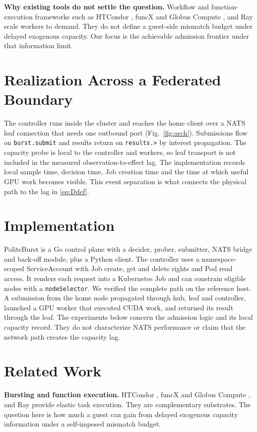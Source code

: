 \documentclass[10pt,conference,letterpaper]{IEEEtran}
\newcommand{\sysname}{PoliteBurst}
\begin{document}
\textbf{Why existing tools do not settle the question.}
Workflow and function-execution frameworks such as HTCondor \cite{htcondor},
funcX and Globus Compute \cite{funcx}, and Ray \cite{ray} scale workers to demand.
They do not define a guest-side mismatch budget under delayed exogenous capacity.
Our focus is the achievable admission frontier under that information limit.



\section{Realization Across a Federated Boundary}
\label{sec:fabric}
The controller runs inside the cluster and reaches the home client over a NATS
\cite{nats} leaf connection that needs one outbound port
(Fig.~\ref{fig:arch}). Submissions flow on \texttt{burst.submit} and results
return on \texttt{results.>} by interest propagation. The capacity probe is local
to the controller and workers, so leaf transport is not included in the measured
observation-to-effect lag. The implementation records local sample time, decision
time, Job creation time and the time at which useful GPU work becomes visible.
This event separation is what connects the physical path to the lag in
\eqref{eq:Ddef}.

\section{Implementation}
\label{sec:impl}
\sysname{} is a Go control plane with a decider, prober, submitter, NATS bridge
and back-off module, plus a Python client. The controller uses a namespace-scoped
ServiceAccount with Job create, get and delete rights and Pod read access. It
renders each request into a Kubernetes Job and can constrain eligible nodes with
a \texttt{nodeSelector}. We verified the complete path on the reference host. A
submission from the home node propagated through hub, leaf and controller,
launched a GPU worker that executed CUDA work, and returned its result through
the leaf. The experiments below concern the admission logic and its local
capacity record. They do not characterize NATS performance or claim that the
network path creates the capacity lag.



\section{Related Work}
\label{sec:related}
\textbf{Bursting and function execution.}
HTCondor \cite{htcondor}, funcX and Globus Compute \cite{funcx}, and Ray
\cite{ray} provide elastic task execution. They are complementary substrates.
The question here is how much a guest can gain from delayed exogenous capacity
information under a self-imposed mismatch budget.
\end{document}
